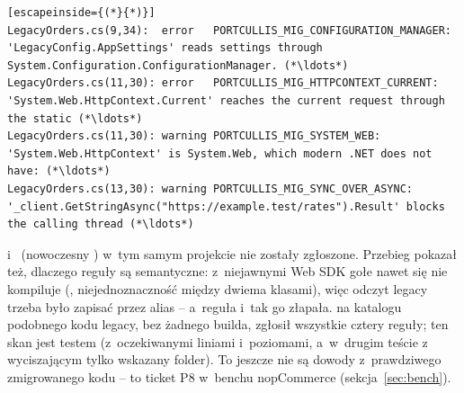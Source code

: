 \begin{lstlisting}[escapeinside={(*}{*)}]
LegacyOrders.cs(9,34):  error   PORTCULLIS_MIG_CONFIGURATION_MANAGER: 'LegacyConfig.AppSettings' reads settings through System.Configuration.ConfigurationManager. (*\ldots*)
LegacyOrders.cs(11,30): error   PORTCULLIS_MIG_HTTPCONTEXT_CURRENT: 'System.Web.HttpContext.Current' reaches the current request through the static (*\ldots*)
LegacyOrders.cs(11,30): warning PORTCULLIS_MIG_SYSTEM_WEB: 'System.Web.HttpContext' is System.Web, which modern .NET does not have: (*\ldots*)
LegacyOrders.cs(13,30): warning PORTCULLIS_MIG_SYNC_OVER_ASYNC: '_client.GetStringAsync("https://example.test/rates").Result' blocks the calling thread (*\ldots*)
\end{lstlisting}

 i~
(nowoczesny ) w~tym samym projekcie nie zostały zgłoszone.
Przebieg pokazał też, dlaczego reguły są semantyczne: z~niejawnymi  Web SDK
gołe  nawet się nie kompiluje (,
niejednoznaczność między dwiema klasami), więc odczyt legacy trzeba było zapisać przez
alias -- a~reguła i~tak go złapała.  na katalogu podobnego kodu
legacy, bez żadnego builda, zgłosił wszystkie cztery reguły; ten skan jest testem
 (z~oczekiwanymi liniami i~poziomami, a~w~drugim teście
z~ wyciszającym tylko wskazany folder). To jeszcze nie są
dowody z~prawdziwego zmigrowanego kodu -- to ticket P8 w~benchu nopCommerce
(sekcja~\ref{sec:bench}).


